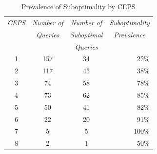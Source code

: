 \begin{table}[t]
\begin{center}
\begin{tabular}{c|c|c|r}
{\em CEPS} & {\em Number of} & {\em Number of} & \multicolumn{1}{|c}{\em Suboptimality}\\
&{\em Queries} & {\em Suboptimal} &  \multicolumn{1}{|c}{\em Prevalence}\\
&&{\em Queries} & \\
\hline
1 & 157 & 34 & 22\%\\
2 & 117 & 45 & 38\%\\
3 & 74 &58 & 78\%\\
4 & 73 & 62 & 85\%\\
5 & 50& 41 & 82\%\\
6 & 22& 20 & 91\%\\
7 & 5& 5 & 100\%\\
8 & 2& 1 & 50\%\\
\end{tabular}
\end{center}
\caption{Prevalence of Suboptimality by CEPS\label{tab:ceps}}
\end{table}

